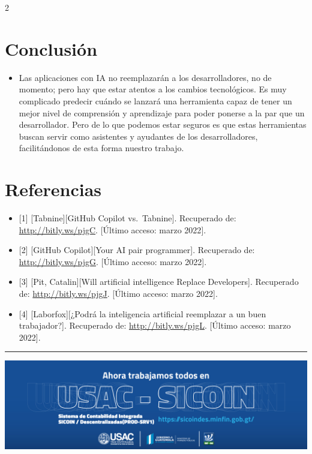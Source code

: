 \documentclass[12pt,spanish,Letterpaper,openany]{book}
\providecommand{\tightlist}{%
  \setlength{\itemsep}{0pt}\setlength{\parskip}{0pt}}
\newcommand{\HRule}{\begin{center}\rule{0.5\linewidth}{0.2mm}\end{center}}
\begin{document}
\begin {multicols}{2}
\begin {flushleft}
\begin{minipage}[c]{\columnwidth}
\end{minipage}

\end {flushleft}

\hypertarget{conclusiuxf3n}{%
\section{Conclusión}\label{conclusiuxf3n}}

\begin{itemize}
\tightlist
\item
  Las aplicaciones con IA no reemplazarán a los desarrolladores, no de momento; pero hay que estar atentos a los cambios tecnológicos. Es muy complicado predecir cuándo se lanzará una herramienta capaz de tener un mejor nivel de comprensión y aprendizaje para poder ponerse a la par que un desarrollador. Pero de lo que podemos estar seguros es que estas herramientas buscan servir como asistentes y ayudantes de los desarrolladores, facilitándonos de esta forma nuestro trabajo.
\end{itemize}

\hypertarget{referencias}{%
\section{Referencias}\label{referencias}}

\begin{itemize}
\item
  {[}1{]} {[}Tabnine{]}{[}GitHub Copilot vs.~Tabnine{]}. Recuperado de: \url{http://bitly.ws/pjgC}. {[}Último acceso: marzo 2022{]}.
\item
  {[}2{]} {[}GitHub Copilot{]}{[}Your AI pair programmer{]}. Recuperado de: \url{http://bitly.ws/pjgG}. {[}Último acceso: marzo 2022{]}.
\item
  {[}3{]} {[}Pit, Catalin{]}{[}Will artificial intelligence Replace Developers{]}. Recuperado de: \url{http://bitly.ws/pjgJ}. {[}Último acceso: marzo 2022{]}.
\item
  {[}4{]} {[}Laborfox{]}{[}¿Podrá la inteligencia artificial reemplazar a un buen trabajador?{]}. Recuperado de: \url{http://bitly.ws/pjgL}. {[}Último acceso: marzo 2022{]}.
\end{itemize}

\end {multicols}
\medskip
\HRule
\medskip

\begin{center}\includegraphics[width=1\linewidth]{images/publicidad1} \end{center}
\end{document}
